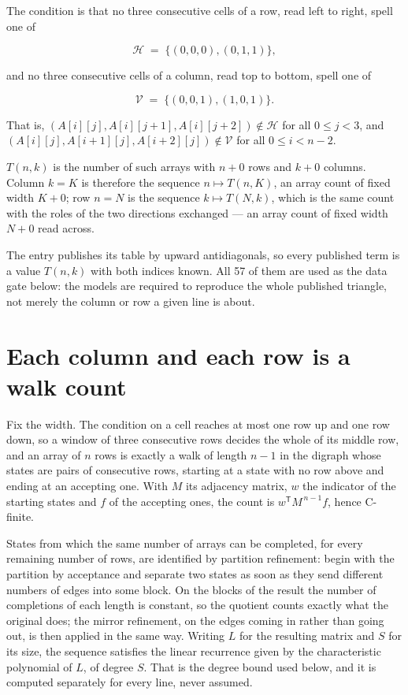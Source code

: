 \documentclass[11pt]{article}
\theoremstyle{definition}
\begin{document}
The condition is that no three consecutive cells of a row, read left to right, spell one of

\[\mathcal{H} \;=\; \{(0,0,0), (0,1,1)\},\]

and no three consecutive cells of a column, read top to bottom, spell one of

\[\mathcal{V} \;=\; \{(0,0,1), (1,0,1)\}.\]

That is, $(A[i][j],A[i][j{+}1],A[i][j{+}2]) \notin \mathcal{H}$ for all $0 \le j < 3$, and $(A[i][j],A[i{+}1][j],A[i{+}2][j]) \notin \mathcal{V}$ for all $0 \le i < n-2$.

$T(n,k)$ is the number of such arrays with $n + 0$ rows and $k + 0$ columns. Column $k = K$ is therefore the sequence $n \mapsto T(n,K)$, an array count of fixed width $K + 0$; row $n = N$ is the sequence $k \mapsto T(N,k)$, which is the same count with the roles of the two directions exchanged --- an array count of fixed width $N + 0$ read across.

The entry publishes its table by upward antidiagonals, so every published term is a value $T(n,k)$ with both indices known. All 57 of them are used as the data gate below: the models are required to reproduce the whole published triangle, not merely the column or row a given line is about.

\section{Each column and each row is a walk count}

Fix the width. The condition on a cell reaches at most one row up and one row down, so a window of three consecutive rows decides the whole of its middle row, and an array of $n$ rows is exactly a walk of length $n-1$ in the digraph whose states are pairs of consecutive rows, starting at a state with no row above and ending at an accepting one. With $M$ its adjacency matrix, $w$ the indicator of the starting states and $f$ of the accepting ones, the count is $w^{\mathsf T}M^{\,n-1}f$, hence C-finite.

States from which the same number of arrays can be completed, for every remaining number of rows, are identified by partition refinement: begin with the partition by acceptance and separate two states as soon as they send different numbers of edges into some block. On the blocks of the result the number of completions of each length is constant, so the quotient counts exactly what the original does; the mirror refinement, on the edges coming in rather than going out, is then applied in the same way. Writing $L$ for the resulting matrix and $S$ for its size, the sequence satisfies the linear recurrence given by the characteristic polynomial of $L$, of degree $S$. That is the degree bound used below, and it is computed separately for every line, never assumed.
\end{document}
